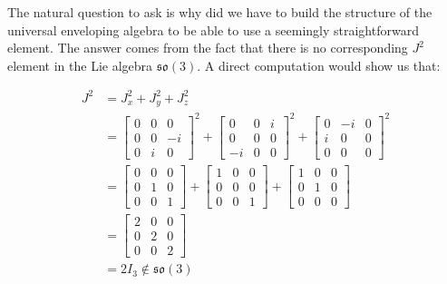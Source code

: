 \documentclass[10pt]{ucthesis}
\begin{document}
The natural question to ask is why did we have to build the structure of the universal enveloping algebra to be able to use a seemingly straightforward element. The answer comes from the fact that there is no corresponding $J^2$ element in the Lie algebra $\mathfrak{so}(3)$. A direct computation would show us that:

\begin{equation} 
	\begin{aligned}
		J^2  &= J_x^2 + J_y^2 + J_z^2 \\
					&= \begin{bmatrix}
								0& 0 & 0 \\
								0 & 0 & -i \\
								0 & i & 0
							\end{bmatrix}^2 +\begin{bmatrix}
													0 & 0 & i \\
													0 & 0 & 0 \\
													-i & 0 & 0
												\end{bmatrix}^2 + \begin{bmatrix}
																			0 & -i & 0\\
																			i & 0 & 0 \\
																			0 & 0 & 0
																		\end{bmatrix}^2 \\
					&= \begin{bmatrix}
								0& 0 & 0 \\
								0 & 1 & 0 \\
								0 & 0 & 1
							\end{bmatrix} +\begin{bmatrix}
													1 & 0 & 0 \\
													0 & 0 & 0 \\
													0 & 0 & 1
												\end{bmatrix} + \begin{bmatrix}
																			1 & 0 & 0\\
																			0 & 1 & 0 \\
																			0 & 0 & 0
																		\end{bmatrix} \\
					&= \begin{bmatrix}
								2& 0 & 0 \\
								0 & 2 & 0 \\
								0 & 0 & 2
							\end{bmatrix} \\
					&= 2I_3 \notin \mathfrak{so}(3)
	\end{aligned}
\end{equation} 
\end{document}
